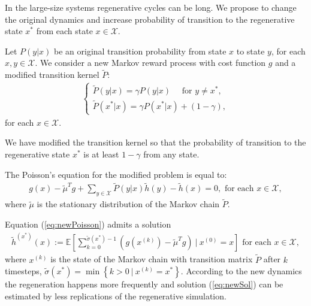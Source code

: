 \documentclass[11pt]{article}
\newcommand{\E}{\mathbb{E}}
\newcommand{\X}{\mathcal{X}}
\theoremstyle{definition}
\numberwithin{equation}{section}
\begin{document}
In the large-size systems regenerative cycles can be long. We propose to change the original dynamics and increase probability of transition to the regenerative state $x^*$ from each state $x\in \X.$

Let $P(y|x)$ be an original transition probability from state $x$ to state $y$, for each $x,y\in \X$. We consider a new Markov reward process with cost function $g$ and a modified transition kernel $\tilde P$:
\begin{align}\label{eq:newP}
\begin{cases}
\tilde P(y|x) = \gamma P(y|x)\quad \text{ for }y\neq x^*,\\
\tilde P(x^*|x) = \gamma P(x^*|x)+(1-\gamma),
\end{cases}
\end{align}
for each $x\in \X.$

We have modified the transition kernel so that the probability of transition to the regenerative state $x^*$ is at least $1-\gamma$ from any state.

The Poisson's equation for the modified problem is equal to:
\begin{align}\label{eq:newPoisson}
g(x) - \tilde \mu^T g +\sum\limits_{y\in \X} \tilde P(y|x) \tilde h(y) - \tilde h(x) = 0, \text{ for each }x\in \X,
\end{align}
 where $\tilde \mu$ is the stationary distribution of the Markov chain $\tilde P$.

 Equation (\ref{eq:newPoisson}) admits a solution
\begin{align}\label{eq:newSol}
\tilde h^{(x^*)}(x):=\E\left[ \sum\limits_{k=0}^{\tilde \sigma(x^*)-1} \left (g (x^{(k)} )- \tilde \mu^Tg \right )~|~x^{(0)}=x \right] \text{ for each }x\in \X,
\end{align}
where   $x^{(k)}$ is the state of the Markov chain with transition matrix $\tilde P$ after $k$ timesteps,  $\tilde \sigma(x^*) = \min\left\{k>0~|~x^{(k)} = x^*\right\}$.
According to the new dynamics the regeneration happens more frequently and solution (\ref{eq:newSol}) can be estimated by less replications of the regenerative simulation.
\end{document}
